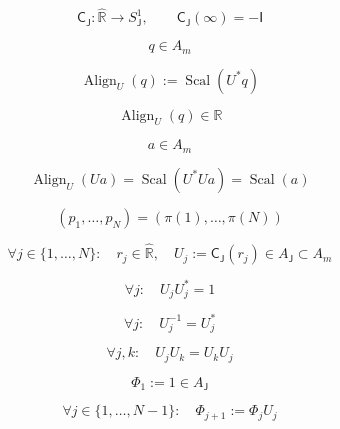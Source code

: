 \documentclass[12pt]{article}
\begin{document}
\begin{equation}
\mathsf{C}_{\mathsf{J}}:\widehat{\mathbb{R}}\to S^1_{\mathsf{J}},\qquad
\mathsf{C}_{\mathsf{J}}(\infty)=-\mathsf{I}
\end{equation}

\begin{equation}
q\in A_m
\end{equation}

\begin{equation}
\operatorname{Align}_U(q):=\operatorname{Scal}(U^{*}q)
\end{equation}

\begin{equation}
\operatorname{Align}_U(q)\in\mathbb{R}
\end{equation}

\begin{equation}
a\in A_m
\end{equation}

\begin{equation}
\operatorname{Align}_U(Ua)=\operatorname{Scal}(U^{*}Ua)=\operatorname{Scal}(a)
\end{equation}

\begin{equation}
(p_1,\dots,p_N)=(\pi(1),\dots,\pi(N))
\end{equation}

\begin{equation}
\forall j\in\{1,\dots,N\}:\quad r_j\in\widehat{\mathbb{R}},\quad
U_j:=\mathsf{C}_{\mathsf{J}}(r_j)\in A_{\mathsf{J}}\subset A_m
\end{equation}

\begin{equation}
\forall j:\quad U_j U_j^{*}=1
\end{equation}

\begin{equation}
\forall j:\quad U_j^{-1}=U_j^{*}
\end{equation}

\begin{equation}
\forall j,k:\quad U_j U_k=U_k U_j
\end{equation}

\begin{equation}
\Phi_1:=1\in A_{\mathsf{J}}
\end{equation}

\begin{equation}
\forall j\in\{1,\dots,N-1\}:\quad \Phi_{j+1}:=\Phi_j U_j
\end{equation}
\end{document}
